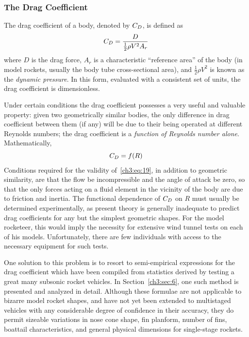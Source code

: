 \subsubsection{The Drag Coefficient}\label{ch3:sec:2.2.2}

The drag coefficient of a body, denoted by $C_{D}$, is defined as
\begin{equation}\label{ch3:eq:18}
C_{D} = \frac{D}{\tfrac{1}{2}\rho V^{2}A_r}
\end{equation}
where $D$ is the drag force, $A_r$ is a characteristic ``reference area'' of the
body (in model rockets, usually the body tube cross-sectional area), and
$\tfrac{1}{2}\rho V^{2}$ is known as the \emph{dynamic pressure}. In this form,
evaluated with a consistent set of units, the drag coefficient is dimensionless.

Under certain conditions the drag coefficient possesses a very useful and valuable
property: given two geometrically similar bodies, the only difference in drag
coefficient between them (if any) will be due to their being operated at different
Reynolds numbers; the drag coefficient is a \emph{function of Reynolds number
alone}. Mathematically,
\begin{equation}\label{ch3:eq:19}
C_{D} = f(R)
\end{equation}
Conditions required for the validity of~\eqref{ch3:eq:19}, in addition to geometric
similarity, are that the flow be incompressible and the angle of attack be zero, so
that the only forces acting on a fluid element in the vicinity of the body are due
to friction and inertia. The functional dependence of $C_{D}$ on $R$ must usually be
determined experimentally, as present theory is generally inadequate to predict drag
coefficients for any but the simplest geometric shapes. For the model rocketeer,
this would imply the necessity for extensive wind tunnel tests on each of his
models. Unfortunately, there are few individuals with access to the necessary
equipment for such tests.

One solution to this problem is to resort to semi-empirical expressions for the
drag coefficient which have been compiled from statistics derived by testing a
great many subsonic rocket vehicles. In Section~\ref{ch3:sec:6}, one such method is
presented and analyzed in detail. Although these formulae are not applicable to
bizarre model rocket shapes, and have not yet been extended to multistaged vehicles
with any considerable degree of confidence in their accuracy, they do permit
sizeable variations in nose cone shape, fin planform, number of fins, boattail
characteristics, and general physical dimensions for single-stage rockets.

